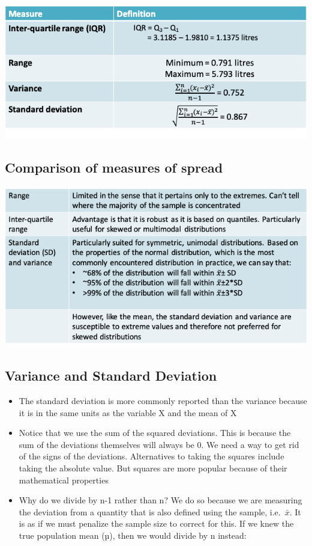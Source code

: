 \documentclass[
]{book}
\providecommand{\tightlist}{%
  \setlength{\itemsep}{0pt}\setlength{\parskip}{0pt}}
\begin{document}
\includegraphics[width=1\linewidth]{./3_13}

\hypertarget{comparison-of-measures-of-spread}{%
\subsection{Comparison of measures of spread}\label{comparison-of-measures-of-spread}}

\includegraphics[width=1\linewidth]{./3_14}

\hypertarget{variance-and-standard-deviation}{%
\subsection{Variance and Standard Deviation}\label{variance-and-standard-deviation}}

\begin{itemize}
\tightlist
\item
  The standard deviation is more commonly reported than the variance because it is in the same units as the variable X and the mean of X
\item
  Notice that we use the sum of the squared deviations. This is because the sum of the deviations themselves will always be 0. We need a way to get rid of the signs of the deviations. Alternatives to taking the squares include taking the absolute value. But squares are more popular because of their mathematical properties
\item
  Why do we divide by n-1 rather than n? We do so because we are measuring the deviation from a quantity that is also defined using the sample, i.e.~\(\bar x\). It is as if we must penalize the sample size to correct for this. If we knew the true population mean (µ), then we would divide by n instead:
\end{itemize}
\end{document}
